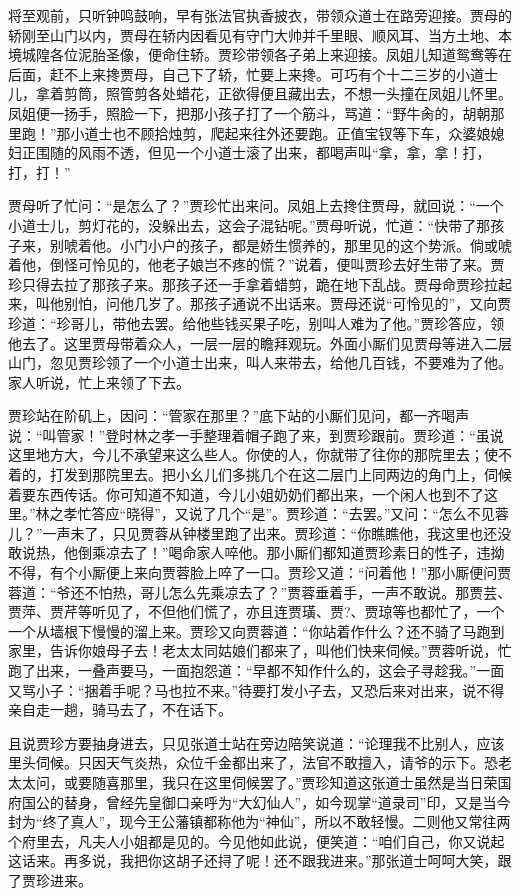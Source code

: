 将至观前，只听钟鸣鼓响，早有张法官执香披衣，带领众道士在路旁迎接。贾母的轿刚至山门以内，贾母在轿内因看见有守门大帅并千里眼、顺风耳、当方土地、本境城隍各位泥胎圣像，便命住轿。贾珍带领各子弟上来迎接。凤姐儿知道鸳鸯等在后面，赶不上来搀贾母，自己下了轿，忙要上来搀。可巧有个十二三岁的小道士儿，拿着剪筒，照管剪各处蜡花，正欲得便且藏出去，不想一头撞在凤姐儿怀里。凤姐便一扬手，照脸一下，把那小孩子打了一个筋斗，骂道：``野牛肏的，胡朝那里跑！''那小道士也不顾拾烛剪，爬起来往外还要跑。正值宝钗等下车，众婆娘媳妇正围随的风雨不透，但见一个小道士滚了出来，都喝声叫``拿，拿，拿！打，打，打！''

贾母听了忙问：``是怎么了？''贾珍忙出来问。凤姐上去搀住贾母，就回说：``一个小道士儿，剪灯花的，没躲出去，这会子混钻呢。''贾母听说，忙道：``快带了那孩子来，别唬着他。小门小户的孩子，都是娇生惯养的，那里见的这个势派。倘或唬着他，倒怪可怜见的，他老子娘岂不疼的慌？''说着，便叫贾珍去好生带了来。贾珍只得去拉了那孩子来。那孩子还一手拿着蜡剪，跪在地下乱战。贾母命贾珍拉起来，叫他别怕，问他几岁了。那孩子通说不出话来。贾母还说``可怜见的''，又向贾珍道：``珍哥儿，带他去罢。给他些钱买果子吃，别叫人难为了他。''贾珍答应，领他去了。这里贾母带着众人，一层一层的瞻拜观玩。外面小厮们见贾母等进入二层山门，忽见贾珍领了一个小道士出来，叫人来带去，给他几百钱，不要难为了他。家人听说，忙上来领了下去。

贾珍站在阶矶上，因问：``管家在那里？''底下站的小厮们见问，都一齐喝声说：``叫管家！''登时林之孝一手整理着帽子跑了来，到贾珍跟前。贾珍道：``虽说这里地方大，今儿不承望来这么些人。你使的人，你就带了往你的那院里去；使不着的，打发到那院里去。把小幺儿们多挑几个在这二层门上同两边的角门上，伺候着要东西传话。你可知道不知道，今儿小姐奶奶们都出来，一个闲人也到不了这里。''林之孝忙答应``晓得''，又说了几个``是''。贾珍道：``去罢。''又问：``怎么不见蓉儿？''一声未了，只见贾蓉从钟楼里跑了出来。贾珍道：``你瞧瞧他，我这里也还没敢说热，他倒乘凉去了！''喝命家人啐他。那小厮们都知道贾珍素日的性子，违拗不得，有个小厮便上来向贾蓉脸上啐了一口。贾珍又道：``问着他！''那小厮便问贾蓉道：``爷还不怕热，哥儿怎么先乘凉去了？''贾蓉垂着手，一声不敢说。那贾芸、贾萍、贾芹等听见了，不但他们慌了，亦且连贾璜、贾?、贾琼等也都忙了，一个一个从墙根下慢慢的溜上来。贾珍又向贾蓉道：``你站着作什么？还不骑了马跑到家里，告诉你娘母子去！老太太同姑娘们都来了，叫他们快来伺候。''贾蓉听说，忙跑了出来，一叠声要马，一面抱怨道：``早都不知作什么的，这会子寻趁我。''一面又骂小子：``捆着手呢？马也拉不来。''待要打发小子去，又恐后来对出来，说不得亲自走一趟，骑马去了，不在话下。

且说贾珍方要抽身进去，只见张道士站在旁边陪笑说道：``论理我不比别人，应该里头伺候。只因天气炎热，众位千金都出来了，法官不敢擅入，请爷的示下。恐老太太问，或要随喜那里，我只在这里伺候罢了。''贾珍知道这张道士虽然是当日荣国府国公的替身，曾经先皇御口亲呼为``大幻仙人''，如今现掌``道录司''印，又是当今封为``终了真人''，现今王公藩镇都称他为``神仙''，所以不敢轻慢。二则他又常往两个府里去，凡夫人小姐都是见的。今见他如此说，便笑道：``咱们自己，你又说起这话来。再多说，我把你这胡子还挦了呢！还不跟我进来。''那张道士呵呵大笑，跟了贾珍进来。

